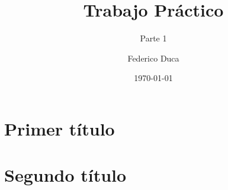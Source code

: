 \documentclass[10pt]{article}
\title{Trabajo Práctico}
\subtitle{Parte 1}
\author{Federico Duca}
\date{\today}
\begin{document}
\maketitle
\tableofcontents
\clearpage

\section{Primer título}
\lipsum[1-5]

\newpage

\section{Segundo título}
\lipsum[1-5]
\end{document}
